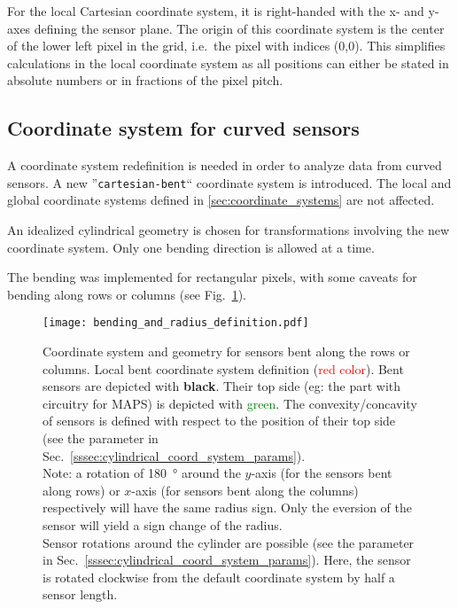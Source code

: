 For the local Cartesian coordinate system, it is right-handed with the x- and y-axes defining the sensor plane.  The origin of this coordinate system is the center of the lower left pixel in the grid, i.e.\ the pixel with indices (0,0).  This simplifies calculations in the local coordinate system as all positions can either be stated in absolute numbers or in fractions of the pixel pitch.

\subsection{Coordinate system for curved sensors}
\label{ssec:bentdetectors}

A coordinate system redefinition is needed in order to analyze data from curved sensors. A new ''\texttt{cartesian-bent}`` coordinate system is introduced. The local and global coordinate systems defined in \ref{sec:coordinate_systems} are not affected.

An idealized cylindrical geometry is chosen for transformations involving the new coordinate system. Only one bending direction is allowed at a time.

The bending was implemented for rectangular pixels, with some caveats for bending along rows or columns (see Fig.~\ref{fig:bent_coord_syst}). 


\begin{figure}[!htp]
\centering
  \texttt{[image: bending\_and\_radius\_definition.pdf]}
  \caption{Coordinate system and geometry for sensors bent along the rows or columns. Local bent coordinate system definition (\textcolor{red}{red color}). Bent sensors are depicted with \textbf{black}. Their top side (eg: the part with circuitry for MAPS) is depicted with \textcolor{green}{green}. The convexity/concavity of sensors is defined with respect to the position of their top side (see the parameter \protect{} in Sec.~\ref{sssec:cylindrical_coord_system_params}). \\ Note: a rotation of \SI{180}{\degree} around the $y$-axis (for the sensors bent along rows) or $x$-axis (for sensors bent along the columns) respectively will have the same radius sign. Only the eversion of the sensor will yield a sign change of the radius. \\
  Sensor rotations around the cylinder are possible (see the parameter \protect{} in Sec.~\ref{sssec:cylindrical_coord_system_params}). Here, the sensor is rotated clockwise from the default coordinate system by half a sensor length.}
\label{fig:bent_coord_syst}
\end{figure}


